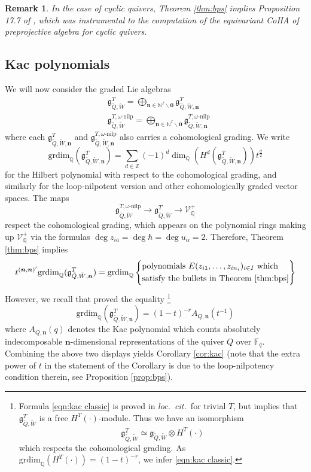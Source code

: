 \documentclass{amsart}
\newtheorem{remark}[theorem]{Remark}
\def\BF{{\mathbb{F}}}
\def\BQ{{\mathbb{Q}}}
\def\CV{{\mathcal{V}}}
\def\nn{{\mathbb{N}^I}}
\def\bn{{\boldsymbol{n}}}
\def\b0{{\boldsymbol{0}}}
\def\loccit{\emph{loc.~cit.~}}
\def\bps{\mathfrak{g}_{\tilde{Q},\tilde{W}}}
\def\tbpsw{\mathfrak{g}^{T,\omega\text{-nilp}}_{\tilde{Q},\tilde{W}}}
\def\tbpswn{\mathfrak{g}^{T,\omega\text{-nilp}}_{\tilde{Q},\tilde{W},\bn}}
\def\tbps{\mathfrak{g}^T_{\tilde{Q},\tilde{W}}}
\def\tbpsn{\mathfrak{g}^T_{\tilde{Q},\tilde{W},\bn}}
\begin{document}
\medskip 

\begin{remark}
In the case of cyclic quivers, Theorem \ref{thm:bps} implies Proposition 17.7 of \cite{J}, which was instrumental to the computation of the equivariant CoHA of preprojective algebra for cyclic quivers. 
\end{remark}

\medskip

\subsection{Kac polynomials}
\label{sub:kac}

We will now consider the graded Lie algebras
\begin{align*}
&\tbps = \bigoplus_{\bn \in \nn \backslash \b0} \tbpsn \\
&\tbpsw = \bigoplus_{\bn \in \nn \backslash \b0} \tbpswn
\end{align*}
where each $\tbpsn$ and $\tbpswn$ also carries a cohomological grading. We write
$$
\text{grdim}_{\BQ}(\tbpsn) = \sum_{d \in \mathbb{Z}} (-1)^d \dim_{\BQ} \left(H^d(\tbpsn)\right)t^{\frac d2}
$$
for the Hilbert polynomial with respect to the cohomological grading, and similarly for the loop-nilpotent version and other cohomologically graded vector spaces. The maps
$$
\tbpsw \rightarrow \tbps \rightarrow \CV^+_{\BQ}
$$
respect the cohomological grading, which appears on the polynomial rings making up $\CV^+_{\BQ}$ via the formulas $\deg z_{ia} = \deg \hbar = \deg u_\alpha = 2$. Therefore, Theorem \ref{thm:bps} implies 
\begin{equation}
\label{eqn:bps}
t^{(\bn,\bn)^{\prime}} \text{grdim}_{\BQ} (\tbpsn) = \text{grdim}_{\BQ} \left\{\begin{split} &\text{polynomials }E(z_{i1},\dots,z_{in_i})_{i \in I} \text{ which} \\ &\text{satisfy the bullets in Theorem \ref{thm:bps}} \end{split} \right\}
\end{equation}
However, we recall that \cite{davison2022integrality} proved the equality \footnote{Formula \eqref{eqn:kac classic} is proved in \loccit for trivial $T$, but \cite[Theorem A, Section 9.2]{davison2022integrality} implies that $\tbps$ is a free $H^T(\cdot)$-module. Thus we have an isomorphism 
\[ 
\tbps \simeq \bps \otimes H^T(\cdot)
\] 
which respects the cohomological grading. As $\text{grdim}_{\BQ}(H^T(\cdot)) = (1-t)^{-r}$, we infer \eqref{eqn:kac classic}.}
\begin{equation}
\label{eqn:kac classic}
\text{grdim}_{\BQ} (\tbpsn) = (1-t)^{-r}A_{Q,\bn}(t^{-1})
\end{equation}
where $A_{Q,\bn}(q)$ denotes the Kac polynomial which counts absolutely indecomposable $\bn$-dimensional representations of the quiver $Q$ over $\BF_q$. Combining the above two displays yields Corollary \ref{cor:kac} (note that the extra power of $t$ in the statement of the Corollary is due to the loop-nilpotency condition therein, see Proposition \ref{prop:bps}).
\end{document}
